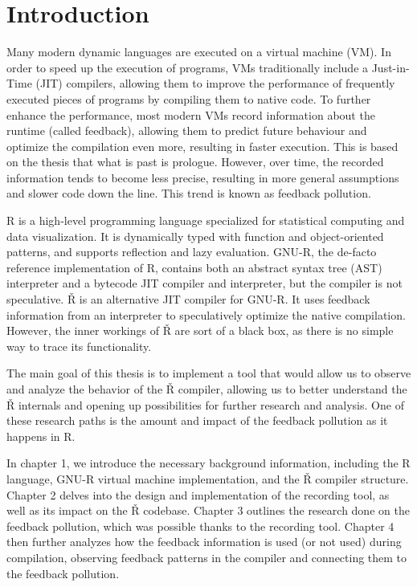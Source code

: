 \chapter*{Introduction}
\setcounter{page}{1}

Many modern dynamic languages are executed on a virtual machine (VM). In order to speed up the execution of programs, VMs traditionally include a Just-in-Time (JIT) compilers, allowing them to improve the performance of frequently executed pieces of programs by compiling them to native code. To further enhance the performance, most modern VMs record information about the runtime (called feedback), allowing them to predict future behaviour and optimize the compilation even more, resulting in faster execution. This is based on the thesis that what is past is prologue. However, over time, the recorded information tends to become less precise, resulting in more general assumptions and slower code down the line. This trend is known as feedback pollution.

R is a high-level programming language specialized for statistical computing and data visualization. It is dynamically typed with function and object-oriented patterns, and supports reflection and lazy evaluation. GNU-R, the de-facto reference implementation of R, contains both an abstract syntax tree (AST) interpreter and a bytecode JIT compiler and interpreter, but the compiler is not speculative. Ř is an alternative JIT compiler for GNU-R. It uses feedback information from an interpreter to speculatively optimize the native compilation. However, the inner workings of Ř are sort of a black box, as there is no simple way to trace its functionality.

The main goal of this thesis is to implement a tool that would allow us to observe and analyze the behavior of the Ř compiler, allowing us to better understand the Ř internals and opening up possibilities for further research and analysis. One of these research paths is the amount and impact of the feedback pollution as it happens in R.

In chapter 1, we introduce the necessary background information, including the R language, GNU-R virtual machine implementation, and the Ř compiler structure. Chapter 2 delves into the design and implementation of the recording tool, as well as its impact on the Ř codebase. Chapter 3 outlines the research done on the feedback pollution, which was possible thanks to the recording tool. Chapter 4 then further analyzes how the feedback information is used (or not used) during compilation, observing feedback patterns in the compiler and connecting them to the feedback pollution.

